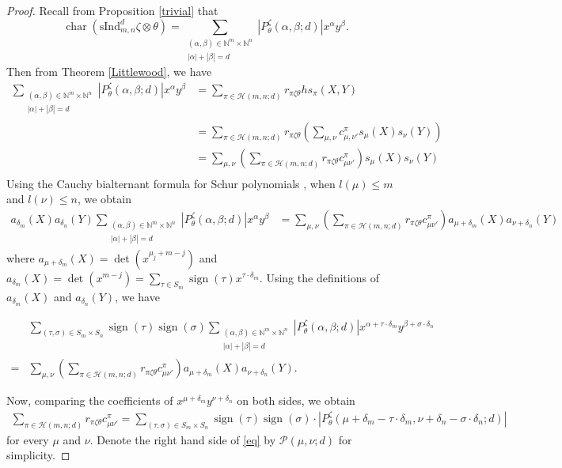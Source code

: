 \documentclass[12pt,reqno]{amsart}
\theoremstyle{definition}
\theoremstyle{remark}
\newcommand{\Hi}{\mathcal{H}(m,n;d)}
\newcommand{\ind}{\mathrm{sInd}_{m,n}^{d}}
\DeclareMathOperator{\ch}{char}
\DeclareMathOperator{\sign}{sign}
\begin{document}
\begin{proof}
Recall from Proposition \ref{trivial} that $$\ch(\ind \zeta\otimes \theta)=\sum_{\substack{(\alpha,\beta)\in\mathbb{N}^{m}\times\mathbb{N}^{n}\\|\alpha|+|\beta|=d}} |P^{\zeta}_{\theta}(\alpha,\beta;d)|x^{\alpha}y^{\beta}.$$ Then from Theorem \ref{Littlewood}, we have
\begin{align*}
\sum_{\substack{(\alpha,\beta)\in\mathbb{N}^{m}\times\mathbb{N}^{n}\\|\alpha|+|\beta|=d}} |P^{\zeta}_{\theta}(\alpha,\beta;d)|x^{\alpha}y^{\beta}&=\sum_{\pi\in \Hi}r_{\pi\zeta\theta}hs_{\pi}(X,Y)\\
&=\sum_{\pi\in\Hi}r_{\pi\zeta\theta}(\sum_{\mu,\nu}c^{\pi}_{\mu,\nu'}s_{\mu}(X)s_{\nu}(Y))\\
&=\sum_{\mu,\nu}(\sum_{\pi\in\Hi}r_{\pi\zeta\theta}c^{\pi}_{\mu\nu'})s_{\mu}(X)s_{\nu}(Y)\\
\end{align*}
Using the Cauchy bialternant formula for Schur polynomials \cite[Equation 3.1]{macdonald1998symmetric}, when $l(\mu)\leq m$ and $l(\nu)\leq n$, we obtain
\begin{align*}
    a_{\delta_{m}}(X)a_{\delta_{n}}(Y)\sum_{\substack{(\alpha,\beta)\in\mathbb{N}^{m}\times\mathbb{N}^{n}\\|\alpha|+|\beta|=d}} |P^{\zeta}_{\theta}(\alpha,\beta;d)|x^{\alpha}y^{\beta}&=\sum_{\mu,\nu}(\sum_{\pi\in\Hi}r_{\pi\zeta\theta}c^{\pi}_{\mu\nu'})a_{\mu+\delta_{m}}(X)a_{\nu+\delta_{n}}(Y)
\end{align*}
 where $a_{\mu+\delta_{m}}(X)=\det (x^{\mu_{j}+m-j})$ and $a_{\delta_{m}}(X)= \det (x^{m-j})=\sum_{\tau\in S_{m}}\sign(\tau)x^{\tau\cdot\delta_{m}}$. Using the definitions of $a_{\delta_{m}}(X)$ and $a_{\delta_{n}}(Y)$, we have

\begin{align*}
    &\sum_{(\tau,\sigma)\in S_{m}\times S_{n}}\sign (\tau)\sign (\sigma)\sum_{\substack{(\alpha,\beta)\in\mathbb{N}^{m}\times\mathbb{N}^{n}\\|\alpha|+|\beta|=d}} |P^{\zeta}_{\theta}(\alpha,\beta;d)|x^{\alpha+\tau\cdot\delta_{m}}y^{\beta+\sigma\cdot\delta_{n}}\\=&\sum_{\mu,\nu}(\sum_{\pi\in\Hi}r_{\pi\zeta\theta}c^{\pi}_{\mu\nu'})a_{\mu+\delta_{m}}(X)a_{\nu+\delta_{n}}(Y).
\end{align*}

Now, comparing the coefficients of $x^{\mu+\delta_{m}}y^{\nu+\delta_{n}}$ on both sides,
we obtain
\begin{align}\label{eq}
    \sum_{\pi\in\Hi}r_{\pi\zeta\theta}c_{\mu\nu'}^{\pi}=\sum_{(\tau,\sigma)\in S_{m}\times S_{n}}\sign(\tau)\sign(\sigma)\cdot |P^{\zeta}_{\theta}(\mu+\delta_{m}-\tau\cdot\delta_{m},\nu+\delta_{n}-\sigma\cdot\delta_{n};d)|
\end{align}
for every $\mu$ and $\nu$. Denote the right hand side of \eqref{eq} by $\mathcal{P}(\mu,\nu;d)$ for simplicity.


\end{proof}
\end{document}
